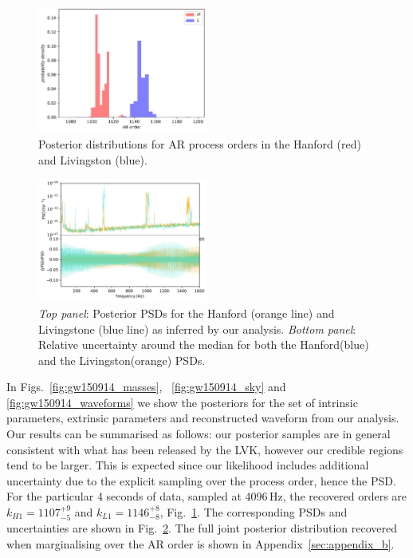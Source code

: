 \documentclass{aa}
\begin{document}
\begin{figure}
	\caption{Posterior distributions for AR process orders in the Hanford (red) and Livingston (blue).}
	\label{fig:gw150914_orders}
	\includegraphics[width=0.5\textwidth,keepaspectratio]{Images/gw150914/orders.pdf}
\end{figure}

\begin{figure}
	\caption{\emph{Top panel}: Posterior PSDs for the Hanford (orange line) and Livingstone (blue line) as inferred by our analysis. \emph{Bottom panel}: Relative uncertainty around the median for both the Hanford(blue) and the Livingston(orange) PSDs.}
	\label{fig:gw150914_psds}
	\includegraphics[width=0.5\textwidth,keepaspectratio]{Images/gw150914/posterior_psds.pdf}
\end{figure}

In Figs.~\ref{fig:gw150914_masses}, ~\ref{fig:gw150914_sky} and \ref{fig:gw150914_waveforms} we show the posteriors for the set of intrinsic parameters, extrinsic parameters and reconstructed waveform from our analysis. Our results can be summarised as follows: our posterior samples are in general consistent with what has been released by the LVK, however our credible regions tend to be larger. This is expected since our likelihood includes additional uncertainty due to the explicit sampling over the process order, hence the PSD. For the particular 4 seconds of data, sampled at 4096\,Hz, the recovered orders are $k_{H1} = 1107_{-5}^{+9}$ and $k_{L1} = 1146_{-8}^{+8}$, Fig.~\ref{fig:gw150914_orders}. The corresponding PSDs and uncertainties are shown in Fig.~\ref{fig:gw150914_psds}. The full joint posterior distribution recovered when marginalising over the AR order is shown in Appendix~\ref{sec:appendix_b}.
\end{document}
